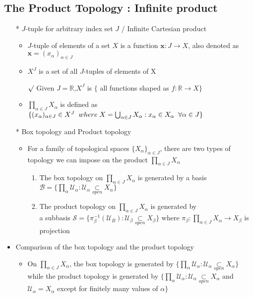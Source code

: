 \documentclass[12pt]{article}
\newcommand{\sptwo}{\hspace{0.2cm}}
\newcommand{\spone}{\hspace{0.1cm}}
\newcommand{\Real}{\mathbb{R}}
\newcommand{\open}{\underset{open}{\subset}}
\begin{document}
\clearpage
\subsection{The Product Topology : Infinite product}
\smallskip
\begin{itemize}
	\item[*] $J$-tuple for arbitrary index set $J$ / Infinite Cartesian product
	\begin{itemize}
		\item $J$-tuple of elements of a set $X$ is a function $\textbf{x} : J \rightarrow X$,  also denoted as $\textbf{x}=(x_\alpha)_{\alpha\in J}$
		\item $X^J$ is a set of all $J$-tuples of elements of X
		\item[$\surd$] Given $J=\Real$,\sptwo  $X^J$ is $\{$ all functions shaped as $f: \Real \rightarrow X\}$
		\item $\prod_{\alpha\in J}X_\alpha$ is defined as $\{(x_\alpha)_{\alpha\in J}\in X^J \sptwo where \spone X=\bigcup_{\alpha\in J}X_\alpha : x_\alpha \in X_\alpha \sptwo \forall \alpha\in J \}$
	\end{itemize}
	\item[*] Box topology and Product topology
	\begin{itemize}
		\item For a family of topological spaces $\{X_\alpha\}_{\alpha\in J}$, there are two types of topology we can impose on the product $\prod_{\alpha\in J}X_\alpha$
		\begin{enumerate}
			\item The box topology on $\prod_{\alpha\in J}X_\alpha$ is generated by a basis $\mathcal{B}=\{\prod_\alpha \mathcal{U}_\alpha : \mathcal{U}_\alpha \open X_\alpha \}$
			\item The product topology on $\prod_{\alpha\in J}X_\alpha$ is generated by \\a subbasis $\mathcal{S}=\{\pi_\beta^{-1}(\mathcal{U}_B) : \mathcal{U}_\beta\open X_\beta \}$ where $\pi_\beta : \prod_{\alpha\in J}X_\alpha \rightarrow X_\beta$ \spone is projection
		\end{enumerate}
	\end{itemize}
	\item Comparison of the box topology and the product topology
	\begin{itemize}
		\item On $\prod_{\alpha\in J}X_\alpha$, the box topology is generated by $\{\prod_\alpha \mathcal{U}_\alpha : \mathcal{U}_\alpha \open X_\alpha \}$ while the product topology is generated by $\{\prod_\alpha \mathcal{U}_\alpha : \mathcal{U}_\alpha \open X_\alpha$ and $\mathcal{U}_\alpha=X_\alpha$ except for finitely many values of $\alpha \}$

\end{itemize}
\end{itemize}
\end{document}
